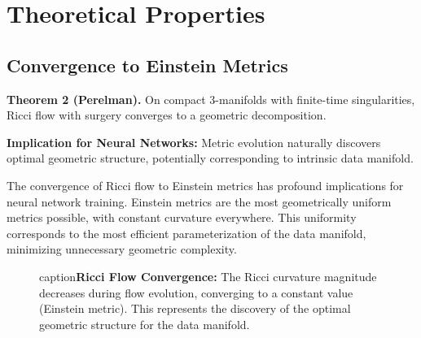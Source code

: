 \documentclass[12pt,a4paper]{article}
\begin{document}
\section{Theoretical Properties}

\subsection{Convergence to Einstein Metrics}

\textbf{Theorem 2 (Perelman).} On compact 3-manifolds with finite-time singularities, Ricci flow with surgery converges to a geometric decomposition.

\textbf{Implication for Neural Networks:} Metric evolution naturally discovers optimal geometric structure, potentially corresponding to intrinsic data manifold.

The convergence of Ricci flow to Einstein metrics has profound implications for neural network training. Einstein metrics are the most geometrically uniform metrics possible, with constant curvature everywhere. This uniformity corresponds to the most efficient parameterization of the data manifold, minimizing unnecessary geometric complexity.

\begin{figure}[htbp]
\centering
{}
caption{\textbf{Ricci Flow Convergence:} The Ricci curvature magnitude 
         decreases during flow evolution, converging to a constant 
         value (Einstein metric). This represents the discovery of 
         the optimal geometric structure for the data manifold.}
\label{fig:convergence}
\end{figure}
\end{document}
